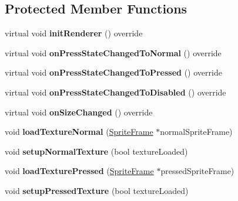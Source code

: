 \subsection*{Protected Member Functions}
\begin{DoxyCompactItemize}
\item 
\mbox{\label{classui_1_1Button_a79905dfdf54a9b312a5ec7a6d698f869}} 
virtual void {\bfseries init\+Renderer} () override
\item 
\mbox{\label{classui_1_1Button_a5f5fcb0fbc2e0bde915508cc7811ef8d}} 
virtual void {\bfseries on\+Press\+State\+Changed\+To\+Normal} () override
\item 
\mbox{\label{classui_1_1Button_af490b88aa20e864d9921668459c49d2f}} 
virtual void {\bfseries on\+Press\+State\+Changed\+To\+Pressed} () override
\item 
\mbox{\label{classui_1_1Button_add94646349fc5c4d9241dd0a9701f15d}} 
virtual void {\bfseries on\+Press\+State\+Changed\+To\+Disabled} () override
\item 
\mbox{\label{classui_1_1Button_a1342ad1c0fcbf20065bc59407a75865a}} 
virtual void {\bfseries on\+Size\+Changed} () override
\item 
\mbox{\label{classui_1_1Button_a9d19bf7a9e022da72f2eebefc6c4e923}} 
void {\bfseries load\+Texture\+Normal} (\hyperlink{classSpriteFrame}{Sprite\+Frame} $\ast$normal\+Sprite\+Frame)
\item 
\mbox{\label{classui_1_1Button_a508d3f57b54727b437b37591b26790df}} 
void {\bfseries setup\+Normal\+Texture} (bool texture\+Loaded)
\item 
\mbox{\label{classui_1_1Button_a968c77f48ebf5a27a650ebb3d71dadb5}} 
void {\bfseries load\+Texture\+Pressed} (\hyperlink{classSpriteFrame}{Sprite\+Frame} $\ast$pressed\+Sprite\+Frame)
\item 
\mbox{\label{classui_1_1Button_a988f25487c02f42c287fcb575d9065d4}} 
void {\bfseries setup\+Pressed\+Texture} (bool texture\+Loaded)
\item 

\end{DoxyCompactItemize}
